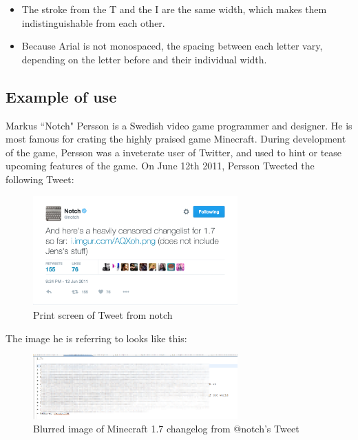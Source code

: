 \begin{itemize}
    \item The stroke from the T and the I are the same width, which makes them indistinguishable from each other.
    \item Because Arial is not monospaced, the spacing between each letter vary, depending on the letter before and their individual width.
\end{itemize}

\subsection{Example of use}
Markus ``Notch" Persson is a Swedish video game programmer and designer. He is most famous for crating the highly praised game Minecraft. During development of the game, Persson was a inveterate user of Twitter, and used to hint or tease upcoming features of the game. On June 12th 2011, Persson Tweeted the following Tweet:

\begin{figure}[ht]
    \centering
    \includegraphics[width=0.7\textwidth]{fig/chapter1/notch_tweet.png}
    \caption{Print screen of Tweet from notch\protect\footnotemark}
\end{figure}

The image he is referring to looks like this:

\begin{figure}[ht]
    \centering
    \includegraphics[width=0.7\textwidth]{fig/chapter1/notch_eclipse.png}
    \caption{Blurred image of Minecraft 1.7 changelog from @notch's Tweet}
\end{figure}

